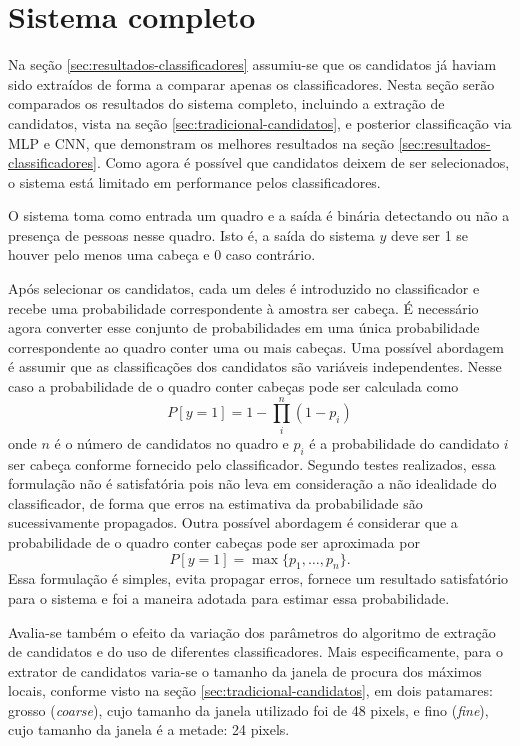 \section{Sistema completo}
Na seção \ref{sec:resultados-classificadores} assumiu-se que os candidatos já haviam sido extraídos de forma a comparar apenas os classificadores. Nesta seção serão comparados os resultados do sistema completo, incluindo a extração de candidatos, vista na seção \ref{sec:tradicional-candidatos}, e posterior classificação via MLP e CNN, que demonstram os melhores resultados na seção \ref{sec:resultados-classificadores}. Como agora é possível que candidatos deixem de ser selecionados, o sistema está limitado em performance pelos classificadores.

O sistema toma como entrada um quadro e a saída é binária detectando ou não a presença de pessoas nesse quadro. Isto é, a saída do sistema $y$ deve ser 1 se houver pelo menos uma cabeça e 0 caso contrário.

Após selecionar os candidatos, cada um deles é introduzido no classificador e recebe uma probabilidade correspondente à amostra ser cabeça. É necessário agora converter esse conjunto de probabilidades em uma única probabilidade correspondente ao quadro conter uma ou mais cabeças. Uma possível abordagem é assumir que as classificações dos candidatos são variáveis independentes. Nesse caso a probabilidade de o quadro conter cabeças pode ser calculada como
\begin{equation}
P[y=1] = 1 - \prod_i^n (1-p_i)
\end{equation}
onde $n$ é o número de candidatos no quadro e $p_i$ é a probabilidade do candidato $i$ ser cabeça conforme fornecido pelo classificador. Segundo testes realizados, essa formulação não é satisfatória pois não leva em consideração a não idealidade do classificador, de forma que erros na estimativa da probabilidade são sucessivamente propagados. Outra possível abordagem é considerar que a probabilidade de o quadro conter cabeças pode ser aproximada por
\begin{equation}
P[y=1] = \max\{p_1, \ldots, p_n  \}.
\end{equation}
Essa formulação é simples, evita propagar erros, fornece um resultado satisfatório para o sistema e foi a maneira adotada para estimar essa probabilidade.

Avalia-se também o efeito da variação dos parâmetros do algoritmo de extração de candidatos e do uso de diferentes classificadores. Mais especificamente, para o extrator de candidatos varia-se o tamanho da janela de procura dos máximos locais, conforme visto na seção \ref{sec:tradicional-candidatos}, em dois patamares: grosso (\textit{coarse}), cujo tamanho da janela utilizado foi de 48 pixels, e fino (\textit{fine}), cujo tamanho da janela é a metade: 24 pixels.

